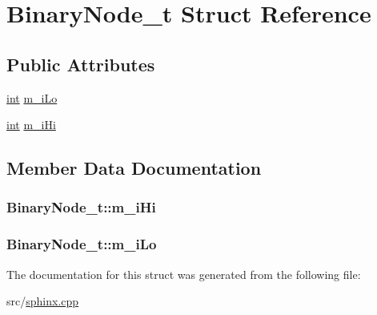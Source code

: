 \hypertarget{structBinaryNode__t}{\section{Binary\-Node\-\_\-t Struct Reference}
\label{structBinaryNode__t}
}
\subsection*{Public Attributes}
\begin{DoxyCompactItemize}
\item 
\hyperlink{sphinxexpr_8cpp_a4a26e8f9cb8b736e0c4cbf4d16de985e}{int} \hyperlink{structBinaryNode__t_a133425fba8b2c67e22cba55653531983}{m\-\_\-i\-Lo}
\item 
\hyperlink{sphinxexpr_8cpp_a4a26e8f9cb8b736e0c4cbf4d16de985e}{int} \hyperlink{structBinaryNode__t_ac4cf8481203abf1047ada463b1e656c0}{m\-\_\-i\-Hi}
\end{DoxyCompactItemize}


\subsection{Member Data Documentation}
\hypertarget{structBinaryNode__t_ac4cf8481203abf1047ada463b1e656c0}{
\subsubsection[{m\-\_\-i\-Hi}]{ Binary\-Node\-\_\-t\-::m\-\_\-i\-Hi}}\label{structBinaryNode__t_ac4cf8481203abf1047ada463b1e656c0}
\hypertarget{structBinaryNode__t_a133425fba8b2c67e22cba55653531983}{
\subsubsection[{m\-\_\-i\-Lo}]{ Binary\-Node\-\_\-t\-::m\-\_\-i\-Lo}}\label{structBinaryNode__t_a133425fba8b2c67e22cba55653531983}


The documentation for this struct was generated from the following file\-:\begin{DoxyCompactItemize}
\item 
src/\hyperlink{sphinx_8cpp}{sphinx.\-cpp}\end{DoxyCompactItemize}
